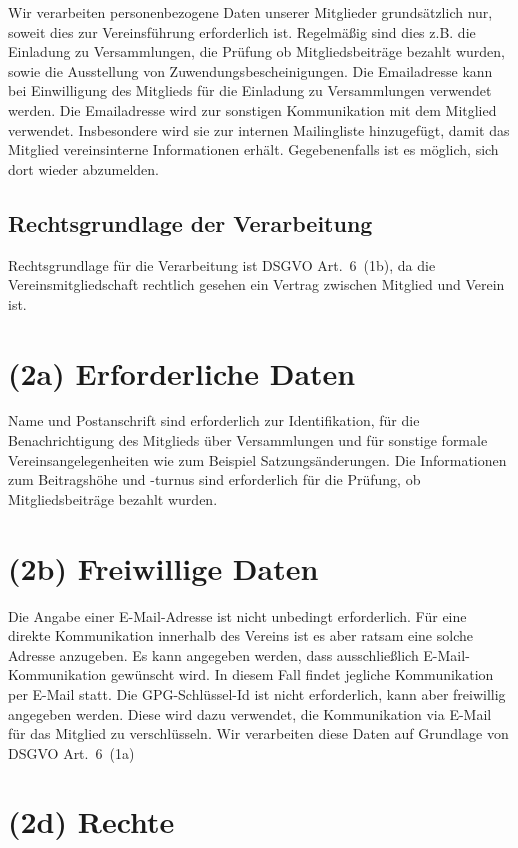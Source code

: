 \documentclass[10pt,a4paper]{scrartcl}
\begin{document}
Wir verarbeiten personenbezogene Daten unserer Mitglieder grundsätzlich
nur, soweit dies zur Vereinsführung erforderlich ist.
Regelmäßig sind dies z.B. die Einladung zu Versammlungen,
die Prüfung ob Mitgliedsbeiträge bezahlt wurden,
sowie die Ausstellung von Zuwendungsbescheinigungen.
%
Die Emailadresse kann bei Einwilligung des Mitglieds für die Einladung
zu Versammlungen verwendet werden.
%
Die Emailadresse wird zur sonstigen Kommunikation mit dem Mitglied
verwendet. Insbesondere wird sie zur internen Mailingliste
hinzugefügt, damit das Mitglied vereinsinterne Informationen erhält.
Gegebenenfalls ist es möglich, sich dort wieder abzumelden.


\subsection*{Rechtsgrundlage der Verarbeitung}

Rechtsgrundlage für die Verarbeitung ist DSGVO Art.~6~(1b), da die
Vereinsmitgliedschaft rechtlich gesehen ein Vertrag zwischen Mitglied
und Verein ist.

\section*{(2a) Erforderliche Daten}

Name und Postanschrift sind erforderlich zur Identifikation, für die
Benachrichtigung des Mitglieds über Versammlungen und für sonstige
formale Vereinsangelegenheiten wie zum Beispiel Satzungsänderungen.
%
Die Informationen zum Beitragshöhe und -turnus sind erforderlich
für die Prüfung, ob Mitgliedsbeiträge bezahlt wurden.


\section*{(2b) Freiwillige Daten}

Die Angabe einer E-Mail-Adresse ist nicht unbedingt erforderlich.
Für eine direkte Kommunikation innerhalb des Vereins ist es aber ratsam eine solche Adresse anzugeben.
Es kann angegeben werden, dass ausschließlich E-Mail-Kommunikation gewünscht wird.
In diesem Fall findet jegliche Kommunikation per E-Mail statt.
%
Die GPG-Schlüssel-Id ist nicht erforderlich, kann aber freiwillig angegeben werden.
Diese wird dazu verwendet, die Kommunikation via E-Mail für das Mitglied zu verschlüsseln.
%
Wir verarbeiten diese Daten auf Grundlage von DSGVO Art.~6~(1a)


\section*{(2d) Rechte}
\end{document}
